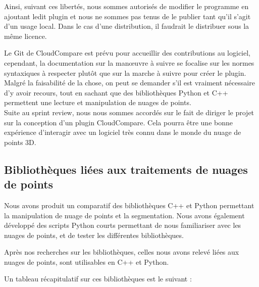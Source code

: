\documentclass[12pt,titlepage,french]{article}
\begin{document}
Ainsi, suivant ces libertés, nous sommes autorisés de modifier le programme en ajoutant ledit plugin et nous ne sommes pas tenus de le publier tant qu'il s'agit d'un usage local. Dans le cas d'une distribution, il faudrait le distribuer sous la même licence.

Le Git de CloudCompare est prévu pour accueillir des contributions au logiciel, cependant, la documentation sur la manœuvre à suivre se focalise sur les normes syntaxiques à respecter plutôt que sur la marche à suivre pour créer le plugin.
Malgré la faisabilité de la chose, on peut se demander s'il est vraiment nécessaire d'y avoir recours, tout en sachant que des bibliothèques Python et C++ permettent une lecture et manipulation de nuages de points.\\
Suite au sprint review, nous nous sommes accordés sur le fait de diriger le projet sur la conception d'un plugin CloudCompare. Cela pourra être une bonne expérience d'interagir avec un logiciel très connu dans le monde du nuage de points 3D.

\subsection{Bibliothèques liées aux traitements de nuages de points}

Nous avons produit un comparatif des bibliothèques C++ et Python permettant la manipulation de nuage de points et la segmentation.
Nous avons également développé des scripts Python courts permettant de nous familiariser avec les nuages de points, et de tester les différentes bibliothèques.

Après nos recherches sur les bibliothèques, celles nous avons relevé liées aux nuages de points, sont utilisables en C++ et Python.

Un tableau récapitulatif sur ces bibliothèques est le suivant : \\
\end{document}
